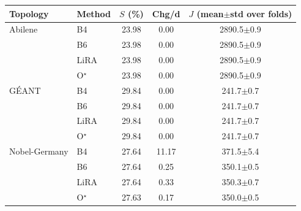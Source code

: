 \begin{tabular}{@{}llccc@{}}
\toprule
Topology & Method & $S$ (\%) & Chg/d & $J$ (mean$\pm$std over folds) \\
\midrule
Abilene & B4 & 23.98 & 0.00 & 2890.5$\pm$0.9 \\
 & B6 & 23.98 & 0.00 & 2890.5$\pm$0.9 \\
 & LiRA & 23.98 & 0.00 & 2890.5$\pm$0.9 \\
 & O$^\star$ & 23.98 & 0.00 & 2890.5$\pm$0.9 \\
\midrule
G\'{E}ANT & B4 & 29.84 & 0.00 & 241.7$\pm$0.7 \\
 & B6 & 29.84 & 0.00 & 241.7$\pm$0.7 \\
 & LiRA & 29.84 & 0.00 & 241.7$\pm$0.7 \\
 & O$^\star$ & 29.84 & 0.00 & 241.7$\pm$0.7 \\
\midrule
Nobel-Germany & B4 & 27.64 & 11.17 & 371.5$\pm$5.4 \\
 & B6 & 27.64 & 0.25 & 350.1$\pm$0.5 \\
 & LiRA & 27.64 & 0.33 & 350.3$\pm$0.7 \\
 & O$^\star$ & 27.63 & 0.17 & 350.0$\pm$0.5 \\

\bottomrule
\end{tabular}
